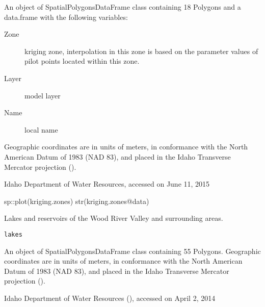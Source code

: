 \documentclass[a4paper]{book}
\begin{document}
%
\begin{Format}
An object of SpatialPolygonsDataFrame class containing 18 Polygons and a
data.frame with the following variables:
\begin{description}

\item[Zone] kriging zone, interpolation in this zone is based on the
parameter values of pilot points located within this zone.
\item[Layer] model layer
\item[Name] local name

\end{description}

Geographic coordinates are in units of meters, in conformance with the
North American Datum of 1983 (NAD 83), and placed in the
Idaho Transverse Mercator projection ().
\end{Format}
%
\begin{Source}\relax
Idaho Department of Water Resources, accessed on June 11, 2015
\end{Source}
%
\begin{SeeAlso}\relax
{}
\end{SeeAlso}
%
\begin{Examples}
\begin{ExampleCode}
sp::plot(kriging.zones)
str(kriging.zones@data)

\end{ExampleCode}
\end{Examples}
%
\begin{Description}\relax
Lakes and reservoirs of the Wood River Valley and surrounding areas.
\end{Description}
%
\begin{Usage}
\begin{verbatim}
lakes
\end{verbatim}
\end{Usage}
%
\begin{Format}
An object of SpatialPolygonsDataFrame class containing 55 Polygons.
Geographic coordinates are in units of meters, in conformance with the
North American Datum of 1983 (NAD 83), and placed in the
Idaho Transverse Mercator projection ().
\end{Format}
%
\begin{Source}\relax
Idaho Department of Water Resources
(),
accessed on April 2, 2014
\end{Source}
\end{document}
